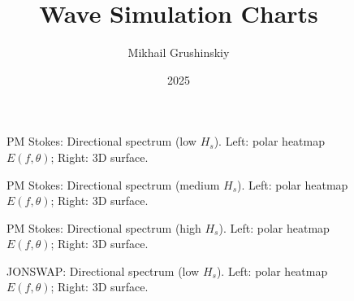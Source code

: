 \documentclass[11pt,letterpaper]{article}
\title{Wave Simulation Charts}
\author{Mikhail Grushinskiy}
\date{2025}
\begin{document}
\maketitle


\begin{figure}[H]\centering
  \begin{minipage}{0.49\textwidth}
    \resizebox{\linewidth}{!}{}
  \end{minipage}\hfill
  \begin{minipage}{0.49\textwidth}
    \resizebox{\linewidth}{!}{}
  \end{minipage}
  \caption{PM Stokes: Directional spectrum (low $H_s$). Left: polar heatmap $E(f,\theta)$; Right: 3D surface.}
  \label{fig:pmstokes_spec_low}
\end{figure}

\begin{figure}[H]\centering
  \begin{minipage}{0.49\textwidth}
    \resizebox{\linewidth}{!}{}
  \end{minipage}\hfill
  \begin{minipage}{0.49\textwidth}
    \resizebox{\linewidth}{!}{}
  \end{minipage}
  \caption{PM Stokes: Directional spectrum (medium $H_s$). Left: polar heatmap $E(f,\theta)$; Right: 3D surface.}
  \label{fig:pmstokes_spec_medium}
\end{figure}

\begin{figure}[H]\centering
  \begin{minipage}{0.49\textwidth}
    \resizebox{\linewidth}{!}{}
  \end{minipage}\hfill
  \begin{minipage}{0.49\textwidth}
    \resizebox{\linewidth}{!}{}
  \end{minipage}
  \caption{PM Stokes: Directional spectrum (high $H_s$). Left: polar heatmap $E(f,\theta)$; Right: 3D surface.}
  \label{fig:pmstokes_spec_high}
\end{figure}

\begin{figure}[H]\centering
  \begin{minipage}{0.49\textwidth}
    \resizebox{\linewidth}{!}{}
  \end{minipage}\hfill
  \begin{minipage}{0.49\textwidth}
    \resizebox{\linewidth}{!}{}
  \end{minipage}
  \caption{JONSWAP: Directional spectrum (low $H_s$). Left: polar heatmap $E(f,\theta)$; Right: 3D surface.}
  \label{fig:jonswap_spec_low}
\end{figure}
\end{document}
